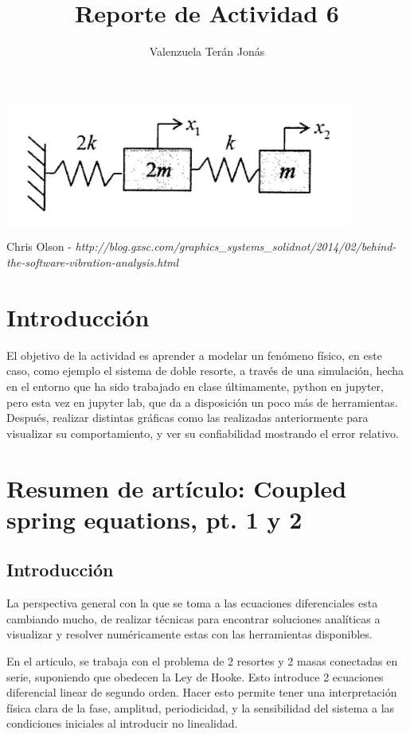 \documentclass[a4paper]{article}
\title{Reporte de Actividad 6}
\author{Valenzuela Terán Jonás}
\begin{document}
\maketitle


\begin{center}
	\includegraphics[height=4cm]{doblespring.png}
    
     Chris Olson - \textit{http://blog.gxsc.com/graphics\_systems\_solidnot/2014/02/behind-the-software-vibration-analysis.html}
\end{center}

\section{Introducción}

El objetivo de la actividad es aprender a modelar un fenómeno físico, en este caso, como ejemplo el sistema de doble resorte, a través de una simulación, hecha en el entorno que ha sido trabajado en clase últimamente, python en jupyter, pero esta vez en jupyter lab, que da a disposición un poco más de herramientas. Después, realizar distintas gráficas como las realizadas anteriormente para visualizar su comportamiento, y ver su confiabilidad mostrando el error relativo.


\section{Resumen de artículo: Coupled spring equations, pt. 1 y 2}

\subsection{Introducción}

La perspectiva general con la que se toma a las ecuaciones diferenciales esta cambiando mucho, de realizar técnicas para encontrar soluciones analíticas a visualizar y resolver numéricamente estas con las herramientas disponibles.

En el articulo, se trabaja con el problema de 2 resortes y 2 masas conectadas en serie, suponiendo que obedecen la Ley de Hooke. Esto introduce 2 ecuaciones diferencial linear de segundo orden. Hacer esto permite tener una interpretación física clara de la fase, amplitud, periodicidad, y la sensibilidad del sistema a las condiciones iniciales al introducir no linealidad.
\end{document}
